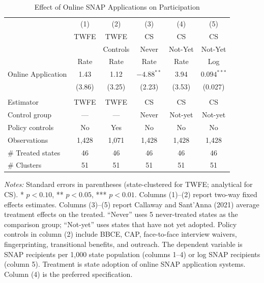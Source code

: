 \begin{table}[H]
\centering
\caption{Effect of Online SNAP Applications on Participation}
\label{tab:main}
\begin{threeparttable}
\begin{tabular}{lccccc}
\toprule
 & (1) & (2) & (3) & (4) & (5) \\
 & TWFE & TWFE & CS & CS & CS \\
 & & Controls & Never & Not-Yet & Not-Yet \\
 & Rate & Rate & Rate & Rate & Log \\
\midrule
Online Application & 1.43 & 1.12 & $-4.88^{**}$ & 3.94 & $0.094^{***}$ \\
 & (3.86) & (3.25) & (2.23) & (3.53) & (0.027) \\
 \\
Estimator & TWFE & TWFE & CS & CS & CS \\
Control group & --- & --- & Never & Not-yet & Not-yet \\
Policy controls & No & Yes & No & No & No \\
Observations & 1,428 & 1,071 & 1,428 & 1,428 & 1,428 \\
\# Treated states & 46 & 46 & 46 & 46 & 46 \\
\# Clusters & 51 & 51 & 51 & 51 & 51 \\
\bottomrule
\end{tabular}
\begin{tablenotes}[flushleft]
\small
\item \textit{Notes:} Standard errors in parentheses (state-clustered for TWFE; analytical for CS). * $p<0.10$, ** $p<0.05$, *** $p<0.01$. Columns (1)--(2) report two-way fixed effects estimates. Columns (3)--(5) report Callaway and Sant'Anna (2021) average treatment effects on the treated. ``Never'' uses 5 never-treated states as the comparison group; ``Not-yet'' uses states that have not yet adopted. Policy controls in column (2) include BBCE, CAP, face-to-face interview waivers, fingerprinting, transitional benefits, and outreach. The dependent variable is SNAP recipients per 1,000 state population (columns 1--4) or log SNAP recipients (column 5). Treatment is state adoption of online SNAP application systems. Column (4) is the preferred specification.
\end{tablenotes}
\end{threeparttable}
\end{table}
